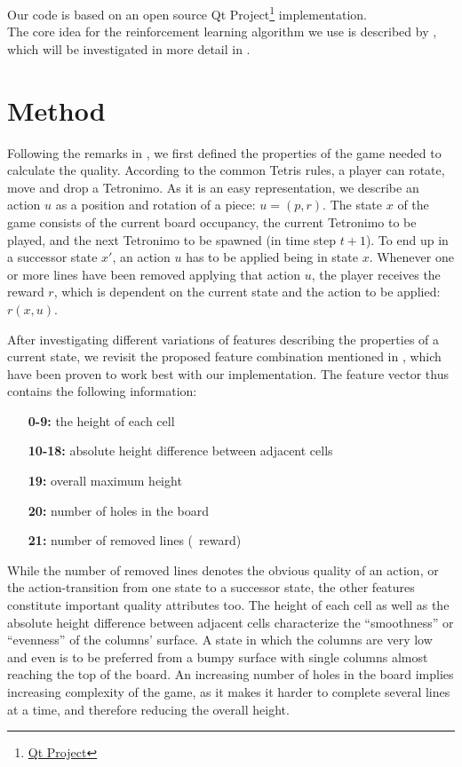 \documentclass{ml}
\begin{document}
Our code is based on an open source Qt Project\footnote{\href{https://qt-project.org/doc/qt-4.8/widgets-tetrix.html}{Qt Project}} implementation. \\
The core idea for the reinforcement learning algorithm we use is described by \cite{zucker2009learning}, which will be investigated in more detail in .


\section{Method}
\label{method}

Following the remarks in \cite{zucker2009learning}, we first defined the properties of the game needed to calculate the quality.
According to the common Tetris rules, a player can rotate, move and drop a Tetronimo. As it is an easy representation, we describe an action $u$ as a position and rotation of a piece: $u = (p,r)$. The state $x$ of the game consists of the current board occupancy, the current Tetronimo to be played, and the next Tetronimo to be spawned (in time step $t+1$). 
To end up in a successor state $x'$, an action $u$ has to be applied being in state $x$. 
Whenever one or more lines have been removed applying that action $u$, the player receives the reward $r$, which is dependent on the current state and the action to be applied: $r(x,u)$.

After investigating different variations of features describing the properties of a current state, we revisit the proposed feature combination mentioned in \cite{zucker2009learning}, which have been proven to work best with our implementation. 
The feature vector thus contains the following information:
\begin{enumerate}
	\item[\textbf{0-9:}] the height of each cell
	\item[\textbf{10-18:}] absolute height difference between adjacent cells
	\item[\textbf{19:}] overall maximum height 
	\item[\textbf{20:}] number of holes in the board
	\item[\textbf{21:}] number of removed lines (\Corresponds~reward)
\end{enumerate}
While the number of removed lines denotes the obvious quality of an action, or the action-transition from one state to a successor state, the other features constitute important quality attributes too. 
The height of each cell as well as the absolute height difference between adjacent cells characterize the ``smoothness'' or ``evenness'' of the columns' surface. 
A state in which the columns are very low and even is to be preferred from a bumpy surface with single columns almost reaching the top of the board. 
An increasing number of holes in the board implies increasing complexity of the game, as it makes it harder to complete several lines at a time, and therefore reducing the overall height. 
\end{document}
